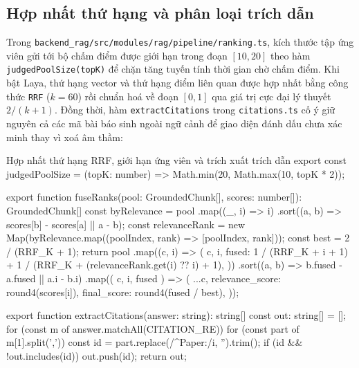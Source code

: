 \subsection{Hợp nhất thứ hạng và phân loại trích dẫn}
\label{subsec:hop-nhat-thu-hang-trich-dan}

Trong \texttt{backend\_\allowbreak{}rag/\allowbreak{}src/\allowbreak{}modules/\allowbreak{}rag/\allowbreak{}pipeline/\allowbreak{}ranking.\allowbreak{}ts}, kích thước tập ứng viên gửi tới bộ chấm điểm được giới hạn trong đoạn $[10, 20]$ theo hàm \texttt{judged\allowbreak{}Pool\allowbreak{}Size(topK)} để chặn tăng tuyến tính thời gian chờ chấm điểm. Khi bật Laya, thứ hạng vector và thứ hạng điểm liên quan được hợp nhất bằng công thức \texttt{RRF} ($k = 60$) rồi chuẩn hoá về đoạn $[0, 1]$ qua giá trị cực đại lý thuyết $2 / (k + 1)$. Đồng thời, hàm \texttt{extractCitations} trong \texttt{citations.ts} cố ý giữ nguyên cả các mã bài báo sinh ngoài ngữ cảnh để giao diện đánh dấu chưa xác minh thay vì xoá âm thầm:

\begin{tsbox}{Hợp nhất thứ hạng RRF, giới hạn ứng viên và trích xuất trích dẫn}
export const judgedPoolSize = (topK: number) => Math.min(20, Math.max(10, topK * 2));

export function fuseRanks(pool: GroundedChunk[], scores: number[]): GroundedChunk[] {
  const byRelevance = pool
    .map((_, i) => i)
    .sort((a, b) => scores[b] - scores[a] || a - b);
  const relevanceRank = new Map(byRelevance.map((poolIndex, rank) => [poolIndex, rank]));
  const best = 2 / (RRF_K + 1);
  return pool
    .map((c, i) => ({
      c,
      i,
      fused: 1 / (RRF_K + i + 1) + 1 / (RRF_K + (relevanceRank.get(i) ?? i) + 1),
    }))
    .sort((a, b) => b.fused - a.fused || a.i - b.i)
    .map(({ c, i, fused }) => ({
      ...c,
      relevance_score: round4(scores[i]),
      final_score: round4(fused / best),
    }));
}

export function extractCitations(answer: string): string[] {
  const out: string[] = [];
  for (const m of answer.matchAll(CITATION_RE)) {
    for (const part of m[1].split(',')) {
      const id = part.replace(/^\s*Paper:\s*/i, '').trim();
      if (id && !out.includes(id)) out.push(id);
    }
  }
  return out;
}
\end{tsbox}


